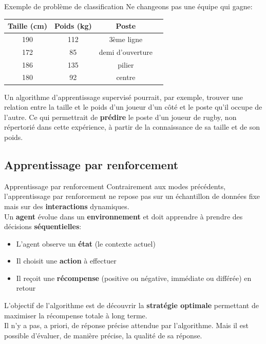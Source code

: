 \documentclass[10pt]{beamer}  %
\begin{document}
\begin{frame}{Exemple de problème de classification}
	Ne changeons pas une équipe qui gagne:
	\begin{table}
		\centering
		\begin{tabular}{|c|c|c|c|}
			\hline
			\textbf{Taille} (cm) & \textbf{Poids} (kg) & \textbf{Poste} \\ \hline
			190             & 112 &  3ème ligne       \\
			172             & 85  &  demi d'ouverture \\
			186             & 135 &  pilier           \\
			180             & 92  &  centre           \\
			\hline
		\end{tabular}
	\end{table}
	Un algorithme d'apprentissage supervisé pourrait, par exemple, trouver une relation entre la taille et le poids d'un joueur d'un côté et le poste qu'il occupe de l'autre. Ce qui permettrait de \textbf{prédire} le poste d'un joueur de rugby, non répertorié dans cette expérience, à partir de la connaissance de sa taille et de son poids.
\end{frame}

\subsection[Apprentissage par renforcement]{Apprentissage par renforcement}

\begin{frame}{Apprentissage par renforcement}
	Contrairement aux modes précédents, l'apprentissage par renforcement ne repose pas sur un échantillon de données fixe mais sur des \textbf{interactions} dynamiques. \\
	\vspace{0.5cm}
	Un \textbf{agent} évolue dans un \textbf{environnement} et doit apprendre à prendre des décisions \textbf{séquentielles}:
	\begin{itemize}
		\item L'agent observe un \textbf{état} (le contexte actuel)
		\item Il choisit une \textbf{action} à effectuer
		\item Il reçoit une \textbf{récompense} (positive ou négative, immédiate ou différée) en retour
	\end{itemize}
	\vspace{0.5cm}
	L'objectif de l'algorithme est de découvrir la \textbf{stratégie optimale} permettant de maximiser la récompense totale à long terme. \\
	\vspace{0.5cm}
	Il n'y a pas, a priori, de réponse précise attendue par l'algorithme. Mais il est possible d'évaluer, de manière précise, la qualité de sa réponse.
\end{frame}
\end{document}
